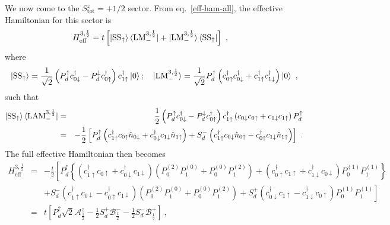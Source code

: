 We now come to the \(S^z_\text{tot}=+ 1/2\) sector. From eq.~\eqref{eff-ham-all}, the effective Hamiltonian for this sector is
\begin{eqnarray}
H_\text{eff}^{3,\frac{1}{2}} &= t \left[\ket{\text{SS}_\uparrow}\bra{\text{LM}_-^{3,\frac{1}{2}}} + \ket{\text{LM}_-^{3,\frac{1}{2}}}\bra{\text{SS}_\uparrow}\right]~,
\end{eqnarray}
where
\begin{eqnarray}
	\ket{\text{SS}_\uparrow} = \frac{1}{\sqrt 2}\left(P_d^{ \uparrow} c^\dagger_{0 \downarrow} - P_d^{ \downarrow} c^\dagger_{0 \uparrow} \right) c^\dagger_{1 \uparrow}\ket{0}; \quad\ket{\text{LM}_-^{3,\frac{1}{2}}} = \frac{1}{\sqrt 2} P_d^\uparrow \left(c^\dagger_{0 \uparrow} c^\dagger_{0 \downarrow} + c^\dagger_{1 \uparrow} c^\dagger_{1 \downarrow}\right) \ket{0}~,
\end{eqnarray}
such that
\begin{eqnarray}
	\ket{\text{SS}_\uparrow}\bra{\text{LAM}_-^{3,\frac{1}{2}}} &=& \frac{1}{2}\left(P_d^{ \uparrow} c^\dagger_{0 \downarrow} - P_d^{ \downarrow} c^\dagger_{0 \uparrow} \right) c^\dagger_{1 \uparrow}  \left(c_{0 \downarrow} c_{0 \uparrow} + c_{1 \downarrow} c_{1 \uparrow}\right)P_d^\uparrow \\
								   &=& -\frac{1}{2}\left[P_d^{ \uparrow} \left(c^\dagger_{1 \uparrow} c_{0 \uparrow}\hat n_{0 \downarrow} + c^\dagger_{0 \downarrow} c_{1 \downarrow} \hat n_{1 \uparrow}\right) + S_d^- \left(c^\dagger_{1 \uparrow}c_{0 \downarrow} \hat n_{0 \uparrow} - c^\dagger_{0 \uparrow} c_{1 \downarrow} \hat n_{1 \uparrow}\right)\right]~.
\end{eqnarray}
The full effective Hamiltonian then becomes
\begin{eqnarray}
	H_\text{eff}^{3,\frac{1}{2}} &=& -\frac{t}{2}\left[P_d^{ \uparrow} \left\{\left(c^\dagger_{1 \uparrow} c_{0 \uparrow} + c^\dagger_{0 \downarrow} c_{1 \downarrow}\right)\left( P_0^{(2)} P_1^{(0)} + P_0^{(0)} P_1^{(2)}\right) + \left(c^\dagger_{0 \uparrow} c_{1 \uparrow} + c^\dagger_{1 \downarrow} c_{0 \downarrow}\right) P_0^{(1)} P_1^{(1)}\right\} \right.\nonumber \\
				     &&\left.+ S_d^- \left(c^\dagger_{1 \uparrow}c_{0 \downarrow} - c^\dagger_{0 \uparrow} c_{1 \downarrow} \right)\left( P_0^{(2)} P_1^{(0)} + P_0^{(0)} P_1^{(2)}\right) + S_d^+ \left(c^\dagger_{0 \downarrow}c_{1 \uparrow} - c^\dagger_{1 \downarrow} c_{0 \uparrow} \right)P_0^{(1)} P_1^{(1)}\right] \nonumber\\
				      &=& t\left[P_d^{ \uparrow} \sqrt 2\mathcal{A}^z_\frac{1}{2} - \frac{1}{2}S_d^+ \mathcal{B}^-_\frac{1}{2} - \frac{1}{2}S_d^- \mathcal{B}^+_\frac{1}{2}\right] ~,
\end{eqnarray}
